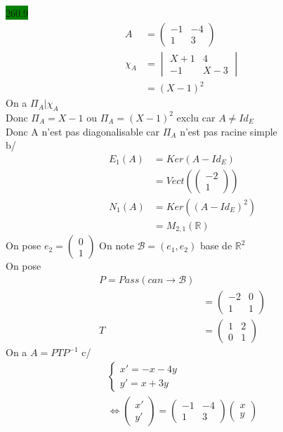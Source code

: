 \documentclass{article}
\begin{document}
\noindent \colorbox{green}{260.9}\\
\begin{align*}
  A &= \begin{pmatrix}
      -1 & -4 \\ 1 & 3 
    \end{pmatrix}\\
    \chi_A &= \begin{vmatrix}
      X+1 & 4 \\ -1 & X-3
    \end{vmatrix}\\
    &= (X-1)^{2}
\end{align*}
On a \(\Pi_A | \chi_A\)\\
Donc \(\Pi_A = X-1\) ou \(\Pi_A = (X-1)^{2}\) exclu car \(A \neq Id_E\)\\
Donc A n'est pas diagonalisable car \(\Pi_A\) n'est pas racine simple \\
b/ 
\begin{align*}
  E_1(A) &= Ker(A-Id_E)\\
    &= Vect(\begin{pmatrix}
        -2 \\ 1
    \end{pmatrix})\\
  N_1(A) &= Ker((A-Id_E)^{2})\\
         &= M_{2,1}(\mathbb{R})
\end{align*}
On pose \(e_2 = \begin{pmatrix}
    0 \\ 1
\end{pmatrix}
\)
On note \(\mathcal{B} = (e_1, e_2)\) base de \(\mathbb{R}^{2}\)\\
On pose 
\begin{align*}
    P = Pass(can \rightarrow \mathcal{B})\\
    &= \begin{pmatrix}
      -2 & 0 \\ 1 & 1
    \end{pmatrix}\\
  T &= \begin{pmatrix}
    1 & 2 \\ 0 & 1
  \end{pmatrix} 
\end{align*}
On a \(A = PTP^{-1}\)
c/ 
\begin{align*}
    \begin{cases}
      x' = -x - 4y \\
      y' = x + 3y 
    \end{cases}\\
    \Leftrightarrow \begin{pmatrix}
        x' \\ y'
    \end{pmatrix} = \begin{pmatrix}
    -1 & -4 \\ 1 & 3
    \end{pmatrix}
    \begin{pmatrix}
        x \\ y 
    \end{pmatrix}
\end{align*}
\end{document}
